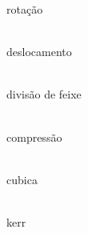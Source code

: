 \documentclass{article}
\begin{document}
rotação \\ \\

\vspace{4em}
deslocamento \\ \\

\vspace{6em}
divisão de feixe \\ \\

\vspace{4em}
compressão \\ \\

\vspace{6em}
cubica \\ \\

\vspace{6em}
kerr \\ \\
\end{document}
